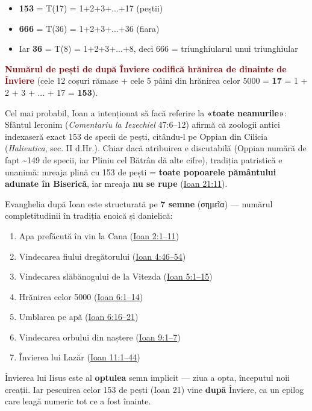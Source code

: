 \documentclass[12pt,a4paper,twoside,openany]{book}
\begin{document}
\begin{itemize}
  \item \textbf{153} = T(17) = 1+2+3+...+17 (peștii)
  \item \textbf{666} = T(36) = 1+2+3+...+36 (fiara)
  \item Iar \textbf{36} = T(8) = 1+2+3+...+8, deci 666 = triunghiularul unui triunghiular
\end{itemize}
\textcolor{darkred}{\textbf{Numărul de pești de după Înviere codifică hrănirea de dinainte de Înviere}} (cele 12 coșuri rămase + cele 5 pâini din hrănirea celor 5000 = \textbf{17} = 1 + 2 + 3 + ... + 17 = \textbf{153}).

Cel mai probabil, Ioan a intenționat să facă referire la \textbf{«toate neamurile»}: Sfântul Ieronim (\textit{Comentariu la Iezechiel} 47:6–12) afirmă că zoologii antici indexaseră exact 153 de specii de pești, citându-l pe Oppian din Cilicia (\textit{Halieutica}, sec. II d.Hr.). Chiar dacă atribuirea e discutabilă (Oppian numără de fapt \textasciitilde{}149 de specii, iar Pliniu cel Bătrân dă alte cifre), tradiția patristică e unanimă: mreaja plină cu 153 de pești = \textbf{toate popoarele pământului adunate în Biserică}, iar mreaja \textbf{nu se rupe} (\href{https://bibliaortodoxa.ro/carte.php?id=35\&cap=21\#11}{Ioan 21:11}).

Evanghelia după Ioan este structurată pe \textbf{7 semne} (σημεῖα) — numărul completitudinii în tradiția enoică și danielică:

\begin{enumerate}
  \item Apa prefăcută în vin la Cana (\href{https://bibliaortodoxa.ro/carte.php?id=35\&cap=2\#1}{Ioan 2:1–11})
  \item Vindecarea fiului dregătorului (\href{https://bibliaortodoxa.ro/carte.php?id=35\&cap=4\#46}{Ioan 4:46–54})
  \item Vindecarea slăbănogului de la Vitezda (\href{https://bibliaortodoxa.ro/carte.php?id=35\&cap=5\#1}{Ioan 5:1–15})
  \item Hrănirea celor 5000 (\href{https://bibliaortodoxa.ro/carte.php?id=35\&cap=6\#1}{Ioan 6:1–14})
  \item Umblarea pe apă (\href{https://bibliaortodoxa.ro/carte.php?id=35\&cap=6\#16}{Ioan 6:16–21})
  \item Vindecarea orbului din naștere (\href{https://bibliaortodoxa.ro/carte.php?id=35\&cap=9\#1}{Ioan 9:1–7})
  \item Învierea lui Lazăr (\href{https://bibliaortodoxa.ro/carte.php?id=35\&cap=11\#1}{Ioan 11:1–44})
\end{enumerate}
Învierea lui Iisus este al \textbf{optulea} semn implicit — ziua a opta, începutul noii creații. Iar pescuirea celor 153 de pești (Ioan 21) vine \textbf{după} Înviere, ca un epilog care leagă numeric tot ce a fost înainte.
\end{document}
